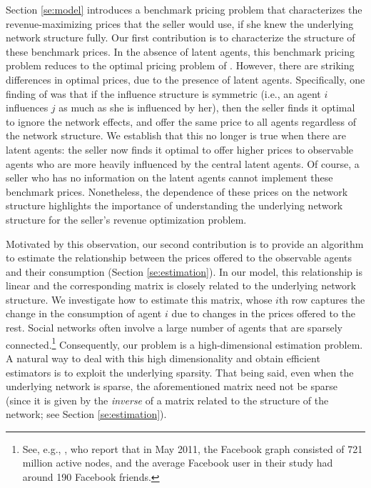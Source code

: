 \documentclass[opre,nonblindrev]{informs3} %
\begin{document}
 
Section \ref{se:model} introduces a benchmark pricing problem that characterizes the revenue-maximizing prices that the seller would use, if she knew the underlying network structure fully.
Our first contribution is to characterize the structure of these benchmark prices.
In the absence of latent agents, this benchmark pricing problem reduces to the optimal pricing problem of \citet{candogan2012optimal}.
However,
there are striking differences in optimal prices, due to the presence of latent agents.
Specifically, one  finding of \citet{candogan2012optimal} was that if the influence structure is symmetric (i.e., an agent $i$ influences $j$ as much as she is influenced by her), then the seller finds it optimal to
ignore the network effects, and
offer the same price to all agents regardless of the network structure.
We establish that this no longer is true when there are latent agents: the seller now finds it optimal to
 offer higher prices to observable agents who are more heavily influenced by the central latent agents.
Of course, a seller who has no information on the latent agents cannot implement these benchmark prices.
Nonetheless, the dependence of these  prices on the network structure highlights the importance of
 understanding the underlying  network structure for the seller's revenue optimization problem.

 
Motivated by this observation, our second contribution is to
provide an algorithm to
estimate 
the relationship between the prices offered to the observable agents and their consumption (Section \ref{se:estimation}).
In our model, this relationship is linear and the corresponding matrix is closely related to the underlying network structure.
We investigate how to estimate this matrix, whose $i$th row captures the change in the consumption of agent $i$ due to changes in the prices offered to the rest.
Social networks often involve a large number of agents that are sparsely connected.\footnote{See, e.g., \citet{ugander2011anatomy}, who report that in May 2011, the Facebook graph consisted of 721 million active nodes, and the average Facebook user in their study had around 190 Facebook friends.}
Consequently, our  problem is a high-dimensional estimation problem.
A natural way to deal with this high dimensionality
and obtain efficient estimators
 is
to exploit the underlying sparsity.
That being said,
even when the underlying network is sparse,
the aforementioned matrix need not be sparse (since it is given by the \emph{inverse} of a matrix related to the structure of the network; see Section \ref{se:estimation}).
\end{document}
